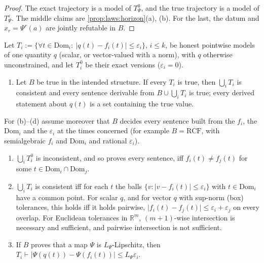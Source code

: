 \begin{proof}
The exact trajectory is a model of $T^0_\Psi$, and the true trajectory is a model of $T^\varepsilon_\Psi$. The middle claims are \cref{prop:laws:horizon}(a), (b). For the last, the datum and $x_r=\Psi^r(a)$ are jointly refutable in $B$.
\end{proof}

\begin{proposition}\label{prop:laws:sound}
Let $T_i:=\{\forall t\in\mathrm{Dom}_i:\ \lvert q(t)-f_i(t)\rvert\le\varepsilon_i\}$, $i\le k$, be honest pointwise models of one quantity $q$ (scalar, or vector-valued with a norm), with $q$ otherwise unconstrained, and let $T^0_i$ be their exact versions ($\varepsilon_i=0$).
\begin{enumerate}[label=(\alph*),itemsep=1pt,topsep=2pt]
\item Let $B$ be true in the intended structure. If every $T_i$ is true, then $\bigcup_iT_i$ is consistent and every sentence derivable from $B\cup\bigcup_iT_i$ is true; every derived statement about $q(t)$ is a set containing the true value.
\end{enumerate}
For (b)--(d) assume moreover that $B$ decides every sentence built from the $f_i$, the $\mathrm{Dom}_i$ and the $\varepsilon_i$ at the times concerned (for example $B=\mathrm{RCF}$, with semialgebraic $f_i$ and $\mathrm{Dom}_i$ and rational $\varepsilon_i$).
\begin{enumerate}[label=(\alph*),resume,itemsep=1pt,topsep=2pt]
\item $\bigcup_iT^0_i$ is inconsistent, and so proves every sentence, iff $f_i(t)\ne f_j(t)$ for some $t\in\mathrm{Dom}_i\cap\mathrm{Dom}_j$.
\item $\bigcup_iT_i$ is consistent iff for each $t$ the balls $\{v:\lvert v-f_i(t)\rvert\le\varepsilon_i\}$ with $t\in\mathrm{Dom}_i$ have a common point. For scalar $q$, and for vector $q$ with sup-norm (box) tolerances, this holds iff it holds pairwise, $\lvert f_i(t)-f_j(t)\rvert\le\varepsilon_i+\varepsilon_j$ on every overlap. For Euclidean tolerances in $\mathbb R^m$, $(m+1)$-wise intersection is necessary and sufficient, and pairwise intersection is not sufficient.
\item If $B$ proves that a map $\Psi$ is $L_\Psi$-Lipschitz, then $T_i\vdash\lvert\Psi(q(t))-\Psi(f_i(t))\rvert\le L_\Psi\varepsilon_i$.
\end{enumerate}
\end{proposition}


